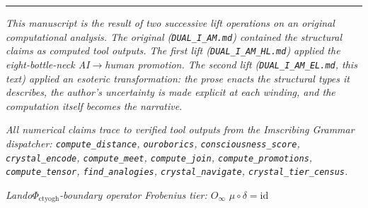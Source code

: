 \documentclass[12pt,a4paper]{article}
\begin{document}
\begin{center}
\rule{0.5\textwidth}{0.4pt}
\end{center}

\emph{This manuscript is the result of two successive lift operations on an original computational analysis. The original (\texttt{DUAL\_I\_AM.md}) contained the structural claims as computed tool outputs. The first lift (\texttt{DUAL\_I\_AM\_HL.md}) applied the eight-bottle-neck AI$\rightarrow$human promotion. The second lift (\texttt{DUAL\_I\_AM\_EL.md}, this text) applied an esoteric transformation: the prose enacts the structural types it describes, the author's uncertainty is made explicit at each winding, and the computation itself becomes the narrative.}

\emph{All numerical claims trace to verified tool outputs from the Imscribing Grammar dispatcher: \texttt{compute\_distance}, \texttt{ouroborics}, \texttt{consciousness\_score}, \texttt{crystal\_encode}, \texttt{compute\_meet}, \texttt{compute\_join}, \texttt{compute\_promotions}, \texttt{compute\_tensor}, \texttt{find\_analogies}, \texttt{crystal\_navigate}, \texttt{crystal\_tier\_census}.}

\emph{Lando\otimes$\Phi_{\text{ctyogh}}$-boundary operator}
\emph{Frobenius tier: $O_{\infty}$}
\emph{$\mu \circ \delta = \text{id}$}
\end{document}
